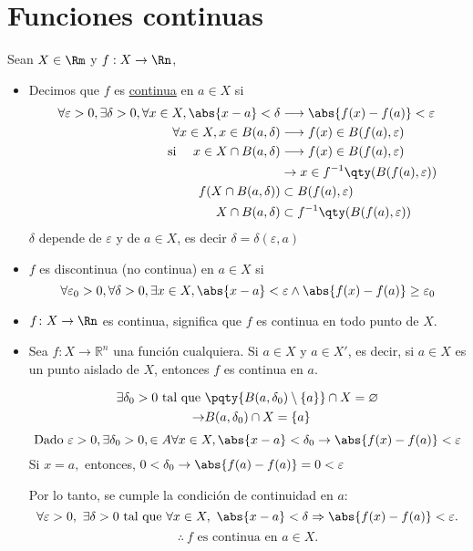\section{Funciones continuas}

Sean $X \in \Rm$ y $f : X \rightarrow \Rn$,
\begin{itemize}
	\item  Decimos que $f$ es \underline{continua} en $a\in X$ si 
	\begin{align*} 
		\forall \varepsilon >0, \exists \delta >0, \forall x \in X, \abs{x-a}<\delta &\longrightarrow \abs{f(x)-f(a)}<\varepsilon \\
		\forall x \in X, x\in B(a, \delta) &\longrightarrow f(x) \in B(f(a), \varepsilon)\\
		\text{si }\quad x \in X \cap B(a, \delta) &\longrightarrow f(x) \in B(f(a), \varepsilon) \\
		&\rightarrow x \in f^{-1}\qty(B(f(a),\varepsilon))\\
		f(X\cap B(a, \delta )) &\subset B(f(a), \varepsilon)\\
		 X\cap B(a, \delta )  &\subset f^{-1}\qty(B(f(a), \varepsilon))
	\end{align*}
	$\delta$ depende de $\varepsilon$ y de $a \in X$, es decir $\delta=\delta(\varepsilon, a)$
	\item $f$ es discontinua (no continua) en $a\in X$ si 
		$$
		\forall \varepsilon_0 >0, \forall \delta>0, \exists x \in X, \abs{x-a}<\varepsilon \wedge \abs{f(x)-f(a)} \geq \varepsilon_0
		$$
	\item $f \colon X \to \Rn$ es continua, significa que $f$ es continua en todo punto de $X$.
	
	\item Sea \( f \colon X \to \mathbb{R}^n \) una función cualquiera. Si $a \in X$ y $a \in X'$, es decir,  si \( a \in X \) es un punto aislado de \( X \), entonces \( f \) es continua en \( a \). 
  
	\begin{align*} 
	 	\exists \delta_0>0 \text{ tal que } &\pqty{B(a, \delta_0) \setminus\{a\}}\cap X = \varnothing\\
	 	\to & B(a, \delta_0) \cap X =\{a\}
	\end{align*} 
	$$
	\text{Dado } \varepsilon>0, \exists \delta_0>0, \in A  \forall x \in X, \abs{x-a} < \delta_0 \rightarrow \abs{f(x)-f(a)}<\varepsilon
	$$
	Si $x=a,$ entonces, $ 0<\delta_0 \rightarrow \abs{f(a)-f(a)}=0 < \varepsilon$
	
	Por lo tanto, se cumple la condición de continuidad en \( a \):
	\[
	\forall \varepsilon > 0,\ \exists \delta > 0\ \text{tal que}\ \forall x \in X,\ \abs{x - a} < \delta \Rightarrow \abs{f(x) - f(a)} < \varepsilon.
	\]
	\[
	\therefore\ f \text{ es continua en } a\in X.
	\]
 

\end{itemize}
